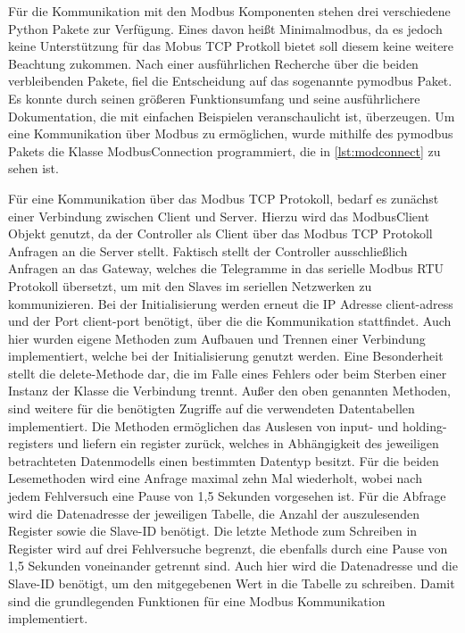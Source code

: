 

Für die Kommunikation mit den Modbus Komponenten stehen drei verschiedene Python Pakete zur Verfügung. Eines davon heißt Minimalmodbus, da es jedoch keine Unterstützung für das Mobus TCP Protkoll bietet soll diesem keine weitere Beachtung zukommen. Nach einer ausführlichen Recherche über die beiden verbleibenden Pakete, fiel die Entscheidung auf das sogenannte pymodbus Paket. Es konnte durch seinen größeren Funktionsumfang und seine ausführlichere Dokumentation, die mit einfachen Beispielen veranschaulicht ist, überzeugen.
Um eine Kommunikation über Modbus zu ermöglichen,  wurde mithilfe des pymodbus Pakets die Klasse ModbusConnection  programmiert, die in \ref{lst:modconnect} zu sehen ist.

Für eine Kommunikation über das Modbus TCP Protokoll, bedarf es zunächst einer Verbindung zwischen Client und Server. Hierzu wird das ModbusClient Objekt genutzt, da der Controller als Client über das Modbus TCP Protokoll Anfragen an die Server stellt. Faktisch stellt der Controller ausschließlich Anfragen an das Gateway, welches die Telegramme in das serielle Modbus RTU Protokoll übersetzt, um mit den Slaves im seriellen Netzwerken zu kommunizieren. Bei der Initialisierung werden erneut die IP Adresse client-adress und der Port client-port benötigt, über die die Kommunikation stattfindet. Auch hier wurden eigene Methoden zum Aufbauen und Trennen einer Verbindung implementiert, welche bei der Initialisierung genutzt werden. Eine Besonderheit stellt die delete-Methode dar, die im Falle eines Fehlers oder beim Sterben einer Instanz der Klasse die Verbindung trennt. 
Außer den oben genannten Methoden, sind weitere für die benötigten Zugriffe auf die verwendeten Datentabellen implementiert. Die Methoden ermöglichen das Auslesen von input- und holding-registers und liefern ein register zurück, welches in Abhängigkeit des jeweiligen betrachteten Datenmodells einen bestimmten Datentyp besitzt. Für die beiden Lesemethoden wird eine Anfrage maximal zehn Mal wiederholt, wobei nach jedem Fehlversuch eine Pause von 1,5 Sekunden vorgesehen ist. Für die Abfrage wird die Datenadresse der jeweiligen Tabelle, die Anzahl der auszulesenden Register sowie die Slave-ID benötigt. Die letzte Methode zum Schreiben in Register wird auf drei Fehlversuche begrenzt, die ebenfalls durch eine Pause von 1,5 Sekunden voneinander getrennt sind. Auch hier wird die Datenadresse und die Slave-ID benötigt, um den mitgegebenen Wert in die Tabelle zu schreiben.
Damit sind die grundlegenden Funktionen für eine Modbus Kommunikation implementiert.

